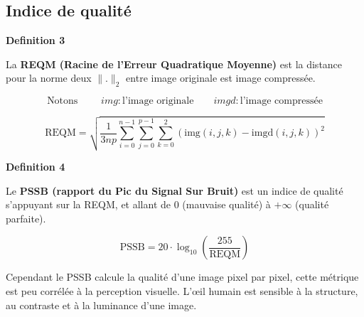 \documentclass{article}
\newenvironment{mydefinition}[1]{%
  \begin{definitionbox}%
  \noindent\textbf{#1}\par
}{%
  \end{definitionbox}%
}
\begin{document}
\subsection{Indice de qualité}

\begin{mydefinition}{Definition 3}

    La \textbf{REQM (Racine de l'Erreur Quadratique Moyenne)} est la distance pour la norme deux $\|\mathbf{.}\|_2$ entre image originale est image compressée.

    \[ \text{Notons } \quad \quad img : \text{l'image originale} \quad \quad imgd : \text{l'image compressée}\]
    
    \[
    \text{REQM} = \sqrt{\frac{1}{3np} \sum_{i=0}^{n-1} \sum_{j=0}^{p-1} \sum_{k=0}^{2} \left( \text{img}(i, j, k) - \text{imgd}(i, j, k) \right)^2}
    \]
\end{mydefinition}

\begin{mydefinition}{Definition 4}

    Le \textbf{PSSB (rapport du Pic du Signal Sur Bruit)} est un indice de qualité s'appuyant sur la REQM, et allant de 0 (mauvaise qualité) à $+\infty$ (qualité parfaite).

    \[
    \text{PSSB} = 20 \cdot \log_{10} \left( \frac{255}{\text{REQM}} \right)
    \]
    
\end{mydefinition}

Cependant le PSSB calcule la qualité d'une image pixel par pixel, cette métrique est peu corrélée à la perception visuelle. L’œil humain est sensible à la structure, au contraste et à la luminance d'une image.
\end{document}
